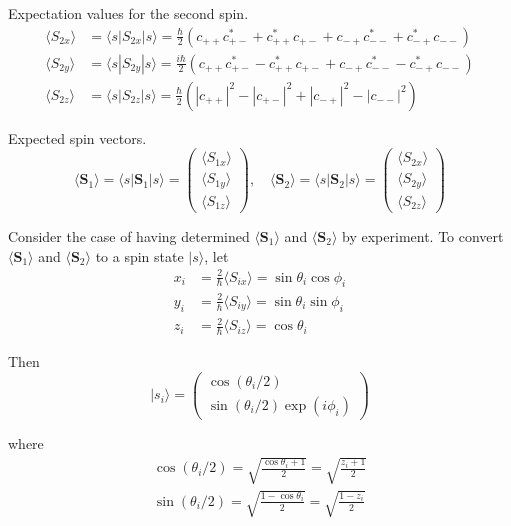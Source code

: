 Expectation values for the second spin.
\begin{align*}
\langle S_{2x}\rangle&=\langle s|S_{2x}|s\rangle
=\frac{\hbar}{2}
\left(c_{++}c_{+-}^*+c_{++}^*c_{+-}+c_{-+}c_{--}^*+c_{-+}^*c_{--}\right)
\\
\langle S_{2y}\rangle&=\langle s|S_{2y}|s\rangle
=\frac{i\hbar}{2}
\left(c_{++}c_{+-}^*-c_{++}^*c_{+-}+c_{-+}c_{--}^*-c_{-+}^*c_{--}\right)
\\
\langle S_{2z}\rangle&=\langle s|S_{2z}|s\rangle
=\frac{\hbar}{2}
\left(|c_{++}|^2-|c_{+-}|^2+|c_{-+}|^2-|c_{--}|^2\right)
\end{align*}

Expected spin vectors.
\begin{equation*}
\langle\mathbf S_1\rangle=\langle s|\mathbf S_1|s\rangle
=\begin{pmatrix}
\langle S_{1x}\rangle\\
\langle S_{1y}\rangle\\
\langle S_{1z}\rangle
\end{pmatrix},\quad
\langle\mathbf S_2\rangle=\langle s|\mathbf S_2|s\rangle
=\begin{pmatrix}
\langle S_{2x}\rangle\\
\langle S_{2y}\rangle\\
\langle S_{2z}\rangle
\end{pmatrix}
\end{equation*}

Consider the case of having determined $\langle\mathbf S_1\rangle$ and
$\langle\mathbf S_2\rangle$ by experiment.
To convert $\langle\mathbf S_1\rangle$ and $\langle\mathbf S_2\rangle$
to a spin state $|s\rangle$, let
\begin{align*}
x_i&=\frac{2}{\hbar}\langle S_{ix}\rangle=\sin\theta_i\cos\phi_i
\\
y_i&=\frac{2}{\hbar}\langle S_{iy}\rangle=\sin\theta_i\sin\phi_i
\\
z_i&=\frac{2}{\hbar}\langle S_{iz}\rangle=\cos\theta_i
\end{align*}

Then
\begin{equation*}
|s_i\rangle=\begin{pmatrix}\cos(\theta_i/2)\\\sin(\theta_i/2)\exp(i\phi_i)\end{pmatrix}
\end{equation*}

where
\begin{align*}
\cos(\theta_i/2)=\sqrt{\frac{\cos\theta_i+1}{2}}=\sqrt{\frac{z_i+1}{2}}
\\
\sin(\theta_i/2)=\sqrt{\frac{1-\cos\theta_i}{2}}=\sqrt{\frac{1-z_i}{2}}
\end{align*}

